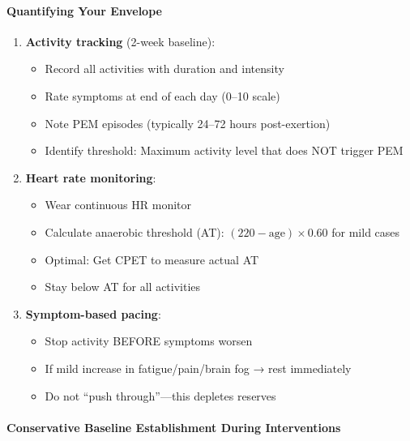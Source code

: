 \paragraph{Quantifying Your Envelope}

\begin{enumerate}
    \item \textbf{Activity tracking} (2-week baseline):
    \begin{itemize}
        \item Record all activities with duration and intensity
        \item Rate symptoms at end of each day (0--10 scale)
        \item Note PEM episodes (typically 24--72 hours post-exertion)
        \item Identify threshold: Maximum activity level that does NOT trigger PEM
    \end{itemize}

    \item \textbf{Heart rate monitoring}:
    \begin{itemize}
        \item Wear continuous HR monitor
        \item Calculate anaerobic threshold (AT): $(220 - \text{age}) \times 0.60$ for mild cases
        \item Optimal: Get CPET to measure actual AT
        \item Stay below AT for all activities
    \end{itemize}

    \item \textbf{Symptom-based pacing}:
    \begin{itemize}
        \item Stop activity BEFORE symptoms worsen
        \item If mild increase in fatigue/pain/brain fog → rest immediately
        \item Do not ``push through''—this depletes reserves
    \end{itemize}
\end{enumerate}

\paragraph{Conservative Baseline Establishment During Interventions}

